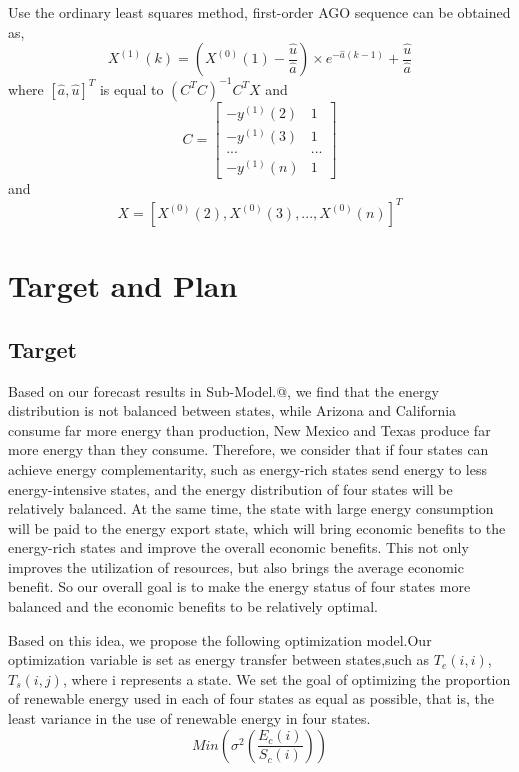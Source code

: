 \documentclass{mcmthesis}
\makeatletter
\newcommand{\Rmnum}[1]{\expandafter\@slowromancap\romannumeral #1@}
\makeatother
\begin{document}
Use the ordinary least squares method, first-order AGO sequence can be obtained as,
\begin{equation}
  X^{(1)}(k)=\left(X^{(0)}(1)-\frac{\hat{u}}{\hat{a}}\right)\times e^{-\hat{a}(k-1)}+\frac{\hat{u}}{\hat{a}}
\end{equation}
where $\left[\hat{a},\hat{u}\right]^T$ is equal to $\left(C^TC\right)^{-1}C^TX$
and
\begin{equation}
C=\begin{bmatrix}-y^{(1)}(2)&1\\-y^{(1)}(3)&1\\...&...\\-y^{(1)}(n)&1\end{bmatrix}
\end{equation}
and
\begin{equation}
  X = \left[X^{(0)}(2),X^{(0)}(3),...,X^{(0)}(n)\right]^T
\end{equation}


\section{Target and Plan}
\subsection{Target}

Based on our forecast results in Sub-Model.\Rmnum{2}, we find that  the energy distribution is not balanced between states,  
while Arizona and California consume far more energy than production, New Mexico and Texas produce far more energy than they consume.
Therefore, we consider that if four states can achieve energy complementarity, such as energy-rich states send energy to less energy-intensive states, and the energy distribution of four states will be relatively balanced.
At the same time, the state with large energy consumption will be paid to the energy export state, which will bring economic benefits to the energy-rich states and improve the overall economic benefits.
This not only improves the utilization of resources, but also brings the average economic benefit.
So our overall goal is to make the energy status of four states more balanced and the economic benefits to be relatively optimal.

Based on this idea, we propose the following optimization model.Our optimization variable is set as energy transfer between states,such as $T_e(i,i)$, $T_s(i,j)$, where i represents a state.
We set the goal of optimizing the proportion of renewable energy used in each of four states as equal as possible, that is, the least variance in the use of renewable energy in four states.
\begin{equation}
  Min{\left({\sigma}^2\left(\frac{E_c(i)}{S_c(i)}\right)\right)}
\end{equation}
\end{document}
